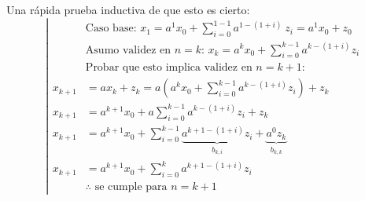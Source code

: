 \documentclass[twocolumn,aps,prl]{revtex4-1}
\begin{document}
Una rápida prueba inductiva de que esto es cierto:
$$
\left|
\begin{aligned}
  & \text{Caso base: } x_1 = a^{1} x_0 + \sum_{i=0}^{1-1} a^{1-(1+i)} \ z_i = a^{1} x_0 +z_0\\
  & \text{Asumo validez en $n=k$: } x_k = a^{k} x_0 + \sum_{i=0}^{k-1} a^{k-(1+i)} z_i\\
  & \text{Probar que esto implica validez en $n=k+1$:} \\
  x_{k+1} &= a x_k + z_k = a (a^{k} x_0 + \sum_{i=0}^{k-1} a^{k-(1+i)} z_i) + z_k \\
  x_{k+1} &= a^{k+1} x_0 + a\sum_{i=0}^{k-1} a^{k-(1+i)} z_i + z_k \\
  x_{k+1} &= a^{k+1} x_0 + \sum_{i=0}^{k-1} \underbrace{a^{k+1-(1+i)} z_i}_{b_{k,i}} + \underbrace{a^0 z_k}_{b_{k,k}} \\
  x_{k+1} &= a^{k+1} x_0 + \sum_{i=0}^{k} a^{k+1-(1+i)} z_i \\
  & \text{$\therefore$ se cumple para $n=k+1$}
\end{aligned}
\right.
$$
\end{document}
